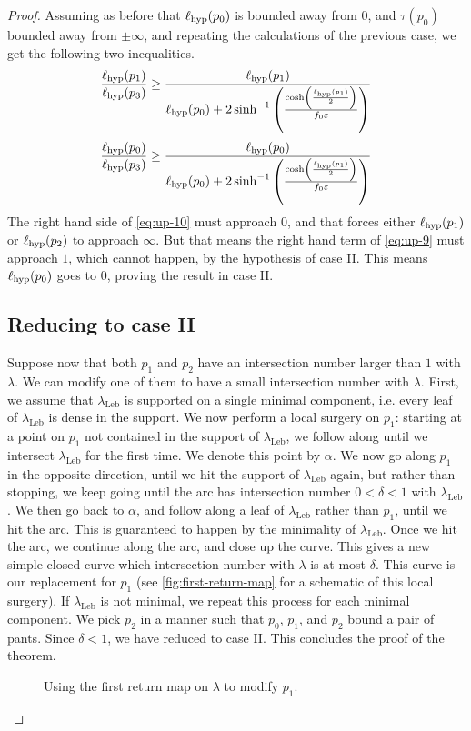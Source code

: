 \documentclass[12pt, reqno]{amsart}
\begin{document}
\begin{proof}
Assuming as before that $\ell_{\mathrm{hyp}}(p_0)$ is bounded away from $0$, and $\tau(p_0)$ bounded away from $\pm \infty$, and repeating the calculations of the previous case, we get the following two inequalities.
\begin{equation}
  \label{eq:up-9}
  \frac{\ell_{\mathrm{hyp}}(p_1)}{\ell_{\mathrm{hyp}}(p_3)} \geq \frac{\ell_{\mathrm{hyp}}(p_1) }{\ell_{\mathrm{hyp}}(p_0) +
  2 \sinh^{-1} \left( \frac{\cosh\left( \frac{\ell_{\mathrm{hyp}}(p_1)}{2} \right)}{f_0 \varepsilon} \right)
  }
\end{equation}
\begin{equation}
  \label{eq:up-10}
  \frac{\ell_{\mathrm{hyp}}(p_0)}{\ell_{\mathrm{hyp}}(p_3)} \geq \frac{\ell_{\mathrm{hyp}}(p_0)}{\ell_{\mathrm{hyp}}(p_0) +
  2 \sinh^{-1} \left( \frac{\cosh\left( \frac{\ell_{\mathrm{hyp}}(p_1)}{2} \right)}{f_0 \varepsilon} \right)
  }
\end{equation}
The right hand side of \eqref{eq:up-10} must approach $0$, and that forces either $\ell_{\mathrm{hyp}}(p_1)$ or $\ell_{\mathrm{hyp}}(p_2)$ to approach $\infty$.
But that means the right hand term of \eqref{eq:up-9} must approach $1$, which cannot happen, by the hypothesis of case II.
This means $\ell_{\mathrm{hyp}}(p_0)$ goes to $0$, proving the result in case II.

\subsection*{Reducing to case II} Suppose now that both $p_1$ and $p_2$ have an intersection number larger than $1$ with $\lambda$.
We can modify one of them to have a small intersection number with $\lambda$.
First, we assume that $\lambda_{\mathrm{Leb}}$ is supported on a single minimal component, i.e. every leaf of $\lambda_{\mathrm{Leb}}$ is dense in the support.
We now perform a local surgery on $p_1$: starting at a point on $p_1$ not contained in the support of $\lambda_{\mathrm{Leb}}$, we follow along until we intersect $\lambda_{\mathrm{Leb}}$ for the first time.
We denote this point by $\alpha$.
We now go along $p_1$ in the opposite direction, until we hit the support of $\lambda_{\mathrm{Leb}}$ again, but rather than stopping, we keep going until the arc has intersection number $0 < \delta < 1$ with $\lambda_{\mathrm{Leb}}$.
We then go back to $\alpha$, and follow along a leaf of $\lambda_{\mathrm{Leb}}$ rather than $p_1$, until we hit the arc.
This is guaranteed to happen by the minimality of $\lambda_{\mathrm{Leb}}$.
Once we hit the arc, we continue along the arc, and close up the curve.
This gives a new simple closed curve which intersection number with $\lambda$ is at most $\delta$.
This curve is our replacement for $p_1$ (see \autoref{fig:first-return-map} for a schematic of this local surgery).
If $\lambda_{\mathrm{Leb}}$ is not minimal, we repeat this process for each minimal component. We pick $p_2$ in a manner such that $p_0$, $p_1$, and $p_2$ bound a pair of pants.
Since $\delta < 1$, we have reduced to case II.
This concludes the proof of the theorem.
\begin{figure}[h]
  \centering
  \caption{Using the first return map on $\lambda$ to modify $p_1$.}
  \label{fig:first-return-map}
\end{figure}
\end{proof}
\end{document}
